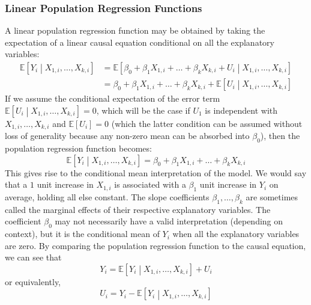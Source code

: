 \documentclass[11pt]{report} %
\begin{document}
\subsubsection{Linear Population Regression Functions}

A linear population regression function may be obtained by taking the expectation of a linear causal equation conditional on all the explanatory variables:
\begin{align}
\mathbb{E}\left[Y_{i}\middle|X_{1, i}, \dots, X_{k, i}\right] &= \mathbb{E}\left[\beta_{0} + \beta_{1}X_{1, i} + \dots + \beta_{k}X_{k, i} + U_{i}\middle|X_{1, i}, \dots, X_{k, i}\right] \\
&= \beta_{0} + \beta_{1}X_{1, i} + \dots + \beta_{k}X_{k, i} + \mathbb{E}\left[U_{i}\middle|X_{1, i}, \dots, X_{k, i}\right]
\end{align}
If we assume the conditional expectation of the error term $\mathbb{E}\left[U_{i}\middle|X_{1, i}, \dots, X_{k, i}\right] = 0$, which will be the case if $U_{1}$ is independent with $X_{1, i}, \dots, X_{k, i}$ and $\mathbb{E}\left[U_{i}\right] = 0$ (which the latter condition can be assumed without loss of generality because any non-zero mean can be absorbed into $\beta_{0}$), then the population regression function becomes:
\begin{equation}
\mathbb{E}\left[Y_{i}\middle|X_{1, i}, \dots, X_{k, i}\right] = \beta_{0} + \beta_{1}X_{1, i} + \dots + \beta_{k}X_{k, i}
\end{equation}
This gives rise to the conditional mean interpretation of the model. We would say that a $1$ unit increase in $X_{1, i}$ is associated with a $\beta_{1}$ unit increase in $Y_{i}$ on average, holding all else constant. The slope coefficients $\beta_{1}, \dots, \beta_{k}$ are sometimes called the marginal effects of their respective explanatory variables. The coefficient $\beta_{0}$ may not necessarily have a valid interpretation (depending on context), but it is the conditional mean of $Y_{i}$ when all the explanatory variables are zero. By comparing the population regression function to the causal equation, we can see that
\begin{equation}
Y_{i} = \mathbb{E}\left[Y_{i}\middle|X_{1, i}, \dots, X_{k, i}\right] + U_{i}
\end{equation}
or equivalently,
\begin{equation}
U_{i} = Y_{i} - \mathbb{E}\left[Y_{i}\middle|X_{1, i}, \dots, X_{k, i}\right]
\end{equation}
\end{document}
